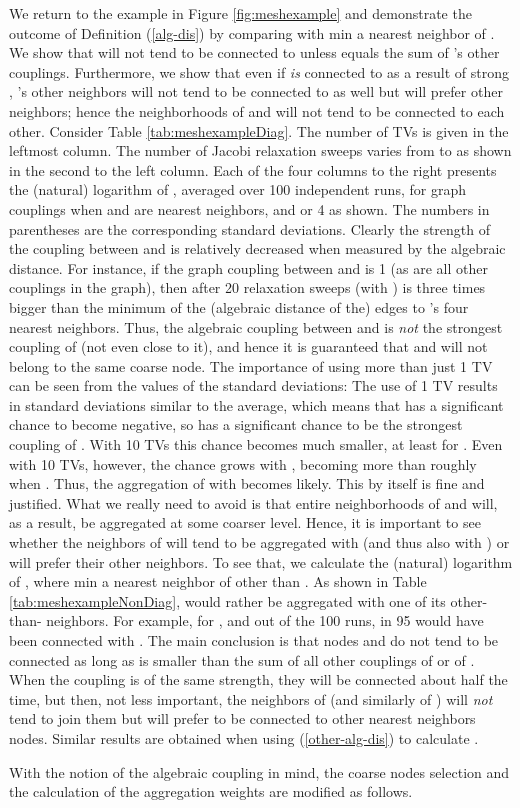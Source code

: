 \documentclass[final]{siamltex}
\begin{document}
\par We return to the example in Figure \ref{fig:meshexample} and demonstrate the
outcome of Definition (\ref{alg-dis}) by comparing  with  min a nearest neighbor of .
We show that  will not tend to be connected to  unless  equals the sum of 's other couplings. Furthermore, we show that even if  {\it is} connected to  as a result of strong , 's other neighbors will not tend to be connected to  as well but will prefer other neighbors; hence the neighborhoods of  and  will not tend to be connected to each other.
Consider Table
\ref{tab:meshexampleDiag}. The number  of TVs is given in the leftmost column.
The number  of Jacobi relaxation sweeps
varies from  to  as shown in the second to the left column. Each of
the four columns to the right presents the (natural) logarithm of ,
averaged over 100 independent runs, for graph
couplings  when  and  are nearest neighbors, and
 or 4 as shown. The numbers in parentheses are the corresponding standard deviations.
Clearly the strength of the coupling between 
and  is relatively decreased when measured by the algebraic distance. For
instance, if the graph coupling between  and  is 1 (as are
all other couplings in the graph), then after 20 relaxation sweeps (with )
 is three times bigger than the minimum of the
(algebraic distance of the) edges to 's four nearest neighbors. Thus,
 the algebraic coupling between  and  is
{\it not} the strongest coupling of  (not even close to it),
and hence it is guaranteed that  and  will not belong to the same coarse node.
The importance of using more than just 1 TV
can be seen from the values of the standard deviations: The use of 1 TV results in standard deviations similar to the average, which means that  has
a significant chance to become negative, so  has a significant chance to be the strongest
coupling of . With 10 TVs this chance becomes much smaller, at least for .
Even with 10 TVs, however, the chance grows with
, becoming more than  roughly when .
Thus, the aggregation of  with   becomes likely. This by itself is fine and justified.
What we really need to avoid is that entire neighborhoods of  and  will, as a result, be aggregated at some coarser level.
Hence, it is important to see whether the neighbors of  will tend to be aggregated with  (and thus also with ) or will prefer their other neighbors. To see that, we calculate the (natural) logarithm of , where
 min a nearest neighbor of  other than .
As shown in Table \ref{tab:meshexampleNonDiag},  would rather be aggregated
with one of its other-than- neighbors. For example, for ,  and  out of the 100 runs, in 95  would have been connected with .
The main conclusion is that nodes  and  do not tend to be connected as long as  is smaller than the sum of all other couplings of  or of . When the coupling is of the same strength, they will be connected about half the time, but then, not less important, the neighbors of  (and similarly of ) will {\it not} tend to join them but will prefer to be connected to other nearest neighbors nodes.
Similar results are obtained when using (\ref{other-alg-dis}) to calculate .
\par With the notion of the algebraic coupling in mind, the
coarse nodes selection and the calculation of the aggregation
weights are modified as follows.
\end{document}

